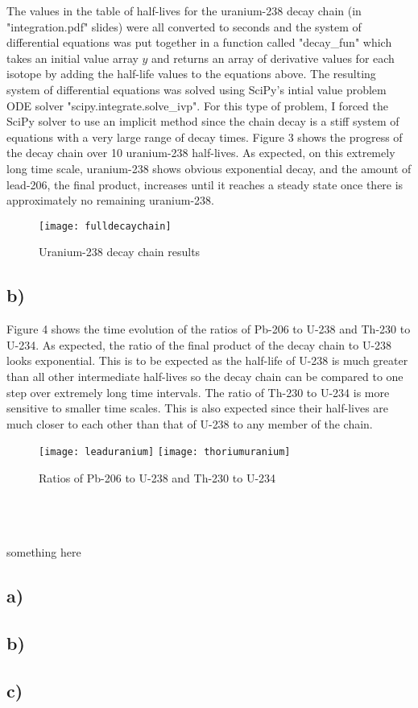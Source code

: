 \documentclass{article}
\newcommand{\<}[1]{\left\langle #1 \right\rangle }
\begin{document}
The values in the table of half-lives for the uranium-238 decay chain (in "integration.pdf" slides) were all converted to seconds and the system of differential equations was put together in a function called "decay\_fun" which takes an initial value array $y$ and returns an array of derivative values for each isotope by adding the half-life values to the equations above. The resulting system of differential equations was solved using SciPy's intial value problem ODE solver "scipy.integrate.solve\_ivp". For this type of problem, I forced the SciPy solver to use an implicit method since the chain decay is a stiff system of equations with a very large range of decay times. Figure 3 shows the progress of the decay chain over 10 uranium-238 half-lives. As expected, on this extremely long time scale, uranium-238 shows obvious exponential decay, and the amount of lead-206, the final product, increases until it reaches a steady state once there is approximately no remaining uranium-238.
\begin{figure}[h]
	\caption{Uranium-238 decay chain results}
	\centering
	\texttt{[image: fulldecaychain]}
\end{figure}

\subsection{b)}
Figure 4 shows the time evolution of the ratios of Pb-206 to U-238 and Th-230 to U-234. As expected, the ratio of the final product of the decay chain to U-238 looks exponential. This is to be expected as the half-life of U-238 is much greater than all other intermediate half-lives so the decay chain can be compared to one step over extremely long time intervals. The ratio of Th-230 to U-234 is more sensitive to smaller time scales. This is also expected since their half-lives are much closer to each other than that of U-238 to any member of the chain.
\begin{figure}[h]
	\caption{Ratios of Pb-206 to U-238 and Th-230 to U-234}
	\centering
	\texttt{[image: leaduranium]}
	\texttt{[image: thoriumuranium]}
\end{figure}
\\


\newpage
\section{}
something here
\subsection{a)}

\subsection{b)}

\subsection{c)}
\end{document}
